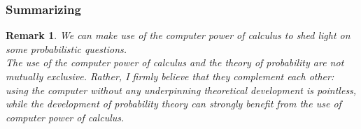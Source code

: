 \documentclass[notes=show,smaller,handout]{beamer}\usepackage[]{graphicx}\usepackage[]{color}
\newtheorem{remark}{Remark}[section]
\begin{document}
\begin{frame}
\frametitle{Summarizing}

\begin{remark}
We can make use of the computer power of calculus to shed light on some probabilistic questions.\\ The use of the computer power of calculus and the theory of probability are not mutually exclusive. Rather, I firmly believe that they complement each other: using the computer without any underpinning theoretical development is pointless, while the development of probability theory can strongly benefit from the use of computer power of calculus.
\end{remark}



\end{frame}
\end{document}
